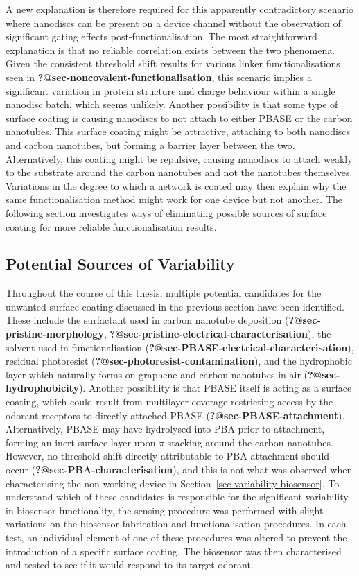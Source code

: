 \documentclass[
  a4paper,
]{scrbook}
\begin{document}
A new explanation is therefore required for this apparently
contradictory scenario where nanodiscs can be present on a device
channel without the observation of significant gating effects
post-functionalisation. The most straightforward explanation is that no
reliable correlation exists between the two phenomena. Given the
consistent threshold shift results for various linker functionalisations
seen in \textbf{?@sec-noncovalent-functionalisation}, this scenario
implies a significant variation in protein structure and charge
behaviour within a single nanodisc batch, which seems unlikely. Another
possibility is that some type of surface coating is causing nanodiscs to
not attach to either PBASE or the carbon nanotubes. This surface coating
might be attractive, attaching to both nanodiscs and carbon nanotubes,
but forming a barrier layer between the two. Alternatively, this coating
might be repulsive, causing nanodiscs to attach weakly to the substrate
around the carbon nanotubes and not the nanotubes themselves. Variations
in the degree to which a network is coated may then explain why the same
functionalisation method might work for one device but not another. The
following section investigates ways of eliminating possible sources of
surface coating for more reliable functionalisation results.

\hypertarget{sec-contamination}{%
\subsection{Potential Sources of Variability}\label{sec-contamination}}

Throughout the course of this thesis, multiple potential candidates for
the unwanted surface coating discussed in the previous section have been
identified. These include the surfactant used in carbon nanotube
deposition (\textbf{?@sec-pristine-morphology},
\textbf{?@sec-pristine-electrical-characterisation}), the solvent used
in functionalisation (\textbf{?@sec-PBASE-electrical-characterisation}),
residual photoresist (\textbf{?@sec-photoresist-contamination}), and the
hydrophobic layer which naturally forms on graphene and carbon nanotubes
in air (\textbf{?@sec-hydrophobicity}). Another possibility is that
PBASE itself is acting as a surface coating, which could result from
multilayer coverage restricting access by the odorant receptors to
directly attached PBASE (\textbf{?@sec-PBASE-attachment}).
Alternatively, PBASE may have hydrolysed into PBA prior to attachment,
forming an inert surface layer upon \(\pi\)-stacking around the carbon
nanotubes. However, no threshold shift directly attributable to PBA
attachment should occur (\textbf{?@sec-PBA-characterisation}), and this
is not what was observed when characterising the non-working device in
Section~\ref{sec-variability-biosensor}. To understand which of these
candidates is responsible for the significant variability in biosensor
functionality, the sensing procedure was performed with slight
variations on the biosensor fabrication and functionalisation
procedures. In each test, an individual element of one of these
procedures was altered to prevent the introduction of a specific surface
coating. The biosensor was then characterised and tested to see if it
would respond to its target odorant.
\end{document}
